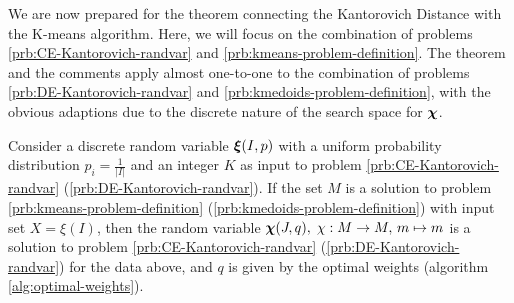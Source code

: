 We are now prepared for the theorem connecting the Kantorovich Distance with the K-means algorithm.
Here, we will focus on the combination of problems \ref{prb:CE-Kantorovich-randvar} and \ref{prb:kmeans-problem-definition}.
The theorem and the comments apply almost one-to-one to the combination of problems \ref{prb:DE-Kantorovich-randvar} and \ref{prb:kmedoids-problem-definition}, with the obvious adaptions due to the discrete nature of the search space for $\boldsymbol\chi$.
\begin{thm}
  \label{thm:kmeans-kantorovich}
  Consider a discrete random variable $\boldsymbol\xi(I,p)$ with a uniform probability distribution $p_i = \frac{1}{|I|}$ and an integer $K$ as input to problem \ref{prb:CE-Kantorovich-randvar} (\ref{prb:DE-Kantorovich-randvar}).
  If the set $M$ is a solution to problem \ref{prb:kmeans-problem-definition} (\ref{prb:kmedoids-problem-definition}) with input set $X=\xi(I)$, then the random variable $\boldsymbol\chi(J,q),\; \chi : M \rightarrow M,\, m\mapsto m$ is a solution to problem \ref{prb:CE-Kantorovich-randvar} (\ref{prb:DE-Kantorovich-randvar}) for the data above, and $q$ is given by the optimal weights (algorithm \ref{alg:optimal-weights}).
\end{thm}
